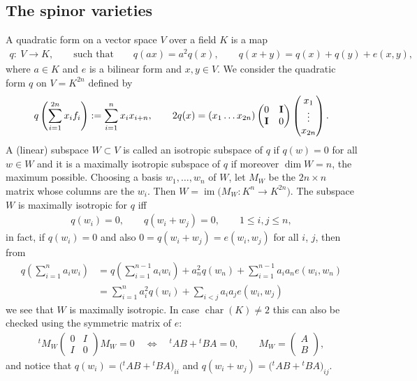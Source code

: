 \documentclass[pdftex]{sigma}
\numberwithin{equation}{section}
\begin{document}
\subsection{The spinor varieties}\label{isotr}\label{pfmap}
A quadratic form on a vector space $V$ over a field $K$ is a map
\begin{gather*}
q\colon \ V \longrightarrow K,\qquad \text{such that}\qquad q(ax) = a^2q(x),\qquad q(x+y) = q(x) + q(y) +e(x,y),
\end{gather*}
where $a\in K$ and $e$ is a bilinear form and $x,y\in V$. We consider the quadratic form $q$ on $V=K^{2n}$ defined by
\begin{gather*}
q\left(\sum_{i=1}^{2n}x_if_i\right) := \sum_{i=1}^nx_ix_{i+n},\qquad 2q(x) = (x_1\ldots x_{2n})
\begin{pmatrix}
 0&{\bf I}\\{\bf I}&0
 \end{pmatrix}\begin{pmatrix}
 x_1\\ \vdots\\x_{2n}
 \end{pmatrix}.
\end{gather*}
A (linear) subspace $W\subset V$ is called an isotropic subspace of $q$ if $q(w)=0$ for all $w\in W$ and it is a maximally isotropic subspace of $q$ if moreover $\dim W=n$, the maximum possible. Choosing a basis $w_1,\ldots, w_n$ of $W$, let $M_W$ be the $2n\times n$ matrix whose columns are the $w_i$. Then $W=\operatorname{im}\big(M_W\colon K^n\rightarrow K^{2n}\big)$. The subspace $W$ is maximally isotropic for $q$ iff
\begin{gather*}
q(w_i) = 0,\qquad q(w_i+w_j) = 0,\qquad 1\le i,j\leq n,
\end{gather*}
in fact, if $q(w_i)=0$ and also $0=q(w_i+w_j)=e(w_i,w_j)$ for all $i$, $j$, then from
\begin{align*}
q\left(\sum_{i=1}^{n}a_iw_i\right) & = q\left(\sum_{i=1}^{n-1}a_iw_i\right)+a_n^2q(w_{n})+\sum_{i=1}^{n-1}a_ia_{n}e(w_i,w_{n}) \\
& = \sum_{i=1}^na_i^2q(w_i) + \sum_{i<j} a_ia_je(w_i,w_j)
\end{align*}
we see that $W$ is maximally isotropic. In case $\operatorname{char}(K)\ne 2$ this can also be checked using the symmetric matrix of $e$:
\begin{gather*}
{}^tM_W\begin{pmatrix}
 0&I\\I&0
 \end{pmatrix} M_W = 0\quad\Longleftrightarrow\quad
 {}^tAB + {}^tBA = 0,\qquad M_W = \begin{pmatrix} A\\B\end{pmatrix},
\end{gather*}
and notice that $q(w_i)=\big({}^tAB + {}^tBA\big)_{ii}$ and $q(w_i +w_j)=\big({}^tAB + {}^tBA\big)_{ij}$.
\end{document}
